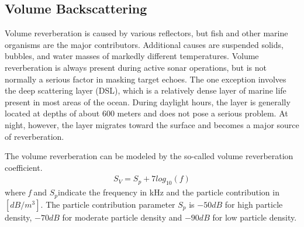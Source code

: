  \subsection{ Volume Backscattering } \label{ Volume Backscattering } 
 \noindent Volume reverberation is caused by various reflectors, but fish and other marine organisms are the major contributors. Additional causes are suspended solids, bubbles, and water masses of markedly different temperatures. Volume reverberation is always present during active sonar operations, but is not normally a serious factor in masking target echoes. The one exception involves the deep scattering layer (DSL), which is a relatively dense layer of marine life present in most areas of the ocean. During daylight hours, the layer is generally located at depths of about 600 meters and does not pose a serious problem. At night, however, the layer migrates toward the surface and becomes a major source of reverberation. 

\noindent The volume reverberation can be modeled by the so-called volume reverberation coefficient.
\begin{align}
{S_V} = {S_p} + 7 log_{10}(\textit{f})
\end{align}
\noindent where \textit{f} and ${S_p}$indicate the frequency in kHz and the particle contribution in $[dB/m^3].$ The particle contribution parameter ${S_p}$ is $-50 dB$ for high particle density, $-70 dB$ for moderate particle density and $-90 dB$ for low particle density.


